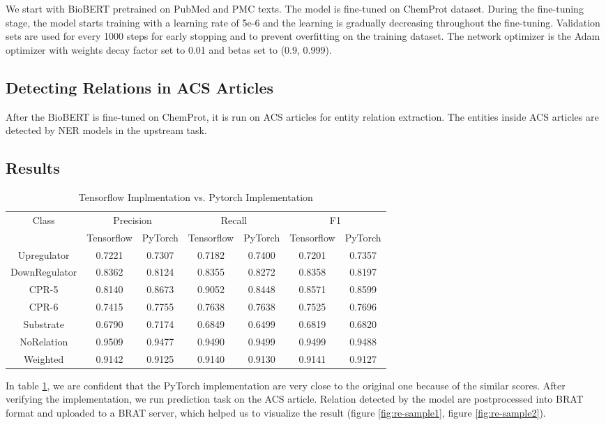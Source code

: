 \documentclass{article}
\begin{document}
We start with BioBERT pretrained on PubMed and PMC texts. The model is fine-tuned on ChemProt dataset. During the
fine-tuning stage, the model starts training with a learning rate of 5e-6 and the learning is gradually decreasing
throughout the fine-tuning. Validation sets are used for every 1000 steps for early stopping and to prevent
overfitting on the training dataset. The network optimizer is the Adam optimizer with weights decay factor set to
0.01 and betas set to (0.9, 0.999).

\subsection{Detecting Relations in ACS Articles}

After the BioBERT is fine-tuned on ChemProt, it is run on ACS articles for entity relation extraction. The entities
inside ACS articles are detected by NER models in the upstream task.

\subsection{Results}

\begin{table}[ht]
\centering
\caption{Tensorflow Implmentation vs. Pytorch Implementation}
\label{tab:score-cmp}
\begin{tabular}{| c | c c | c c | c c |}
\toprule
Class & \multicolumn{2}{c}{Precision} & \multicolumn{2}{|c|}{Recall} & \multicolumn{2}{c|}{F1} \\
& Tensorflow & PyTorch & Tensorflow & PyTorch & Tensorflow & PyTorch \\
\midrule
Upregulator     & 0.7221    & 0.7307    & 0.7182    & 0.7400    & 0.7201    & 0.7357 \\
DownRegulator   & 0.8362    & 0.8124    & 0.8355    & 0.8272    & 0.8358    & 0.8197 \\
CPR-5           & 0.8140    & 0.8673    & 0.9052    & 0.8448    & 0.8571    & 0.8599 \\
CPR-6           & 0.7415    & 0.7755    & 0.7638    & 0.7638    & 0.7525    & 0.7696 \\
Substrate       & 0.6790    & 0.7174    & 0.6849    & 0.6499    & 0.6819    & 0.6820 \\
NoRelation      & 0.9509    & 0.9477    & 0.9490    & 0.9499    & 0.9499    & 0.9488 \\
\midrule
Weighted        & 0.9142    & 0.9125    & 0.9140    & 0.9130    & 0.9141    & 0.9127 \\
\bottomrule
\end{tabular}
\end{table}

In table \ref{tab:score-cmp}, we are confident that the PyTorch implementation are very close to the original one
because of the similar scores. After verifying the implementation, we run prediction task on the ACS article.
Relation detected by the model are postprocessed into BRAT format and uploaded to a BRAT server, which helped us to
visualize the result (figure \ref{fig:re-sample1}, figure \ref{fig:re-sample2}).
\end{document}
